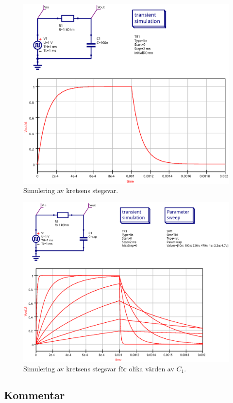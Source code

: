 \begin{figure}[ht]\label{fig:step-sim-step}
  \centering
  \includegraphics[width=\linewidth]{sim/ee466_lab-4_prj/uppgift-2_step}
  \caption[] {Simulering av kretsens stegsvar.}
\end{figure}

\begin{figure}[ht]\label{fig:step-sim-param}
  \centering
  \includegraphics[width=\linewidth]{sim/ee466_lab-4_prj/uppgift-2_param}
  \caption[] {Simulering av kretsens stegsvar för olika värden av $C_1$.}
\end{figure}


\subsection{Kommentar}\label{}

